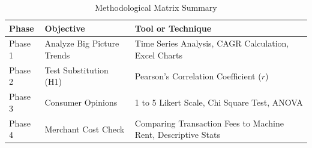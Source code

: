 \begin{table}[H]
    \centering
    \caption{Methodological Matrix Summary}
    \vspace{0.3cm}
    \begin{tabular}{|p{2.5cm}|p{4cm}|p{6cm}|}
    \hline
    \textbf{Phase} & \textbf{Objective} & \textbf{Tool or Technique} \\
    \hline
    Phase 1 & Analyze Big Picture Trends & Time Series Analysis, CAGR Calculation, Excel Charts \\
    \hline
    Phase 2 & Test Substitution (H1) & Pearson's Correlation Coefficient ($r$) \\
    \hline
    Phase 3 & Consumer Opinions & 1 to 5 Likert Scale, Chi Square Test, ANOVA \\
    \hline
    Phase 4 & Merchant Cost Check & Comparing Transaction Fees to Machine Rent, Descriptive Stats \\
    \hline
    \end{tabular}
    \label{tab:methodology_matrix}
\end{table}